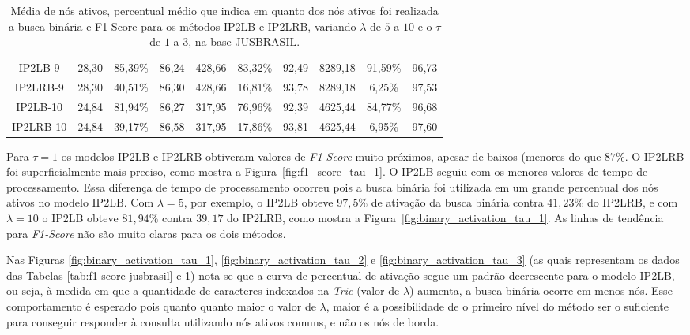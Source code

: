 \begin{table}[]
{\begin{tabular}{c|ccc|ccc|ccc|}
\multicolumn{1}{|c|}{IP2LB-9} & 28,30 & 85,39\% & 86,24 & 428,66 & 83,32\% & 92,49 & 8289,18 & 91,59\% & 96,73 \\
\multicolumn{1}{|c|}{IP2LRB-9} & 28,30 & 40,51\% & 86,30 & 428,66 & 16,81\% & 93,78 & 8289,18 & 6,25\% & 97,53 \\ \hline
\multicolumn{1}{|c|}{IP2LB-10} & 24,84 & 81,94\% & 86,27 & 317,95 & 76,96\% & 92,39 & 4625,44 & 84,77\% & 96,68 \\
\multicolumn{1}{|c|}{IP2LRB-10} & 24,84 & 39,17\% & 86,58 & 317,95 & 17,86\% & 93,81 & 4625,44 & 6,95\% & 97,60 \\ \hline
\end{tabular}%
}
\caption{Média de nós ativos, percentual médio que indica em quanto dos nós ativos foi realizada a busca binária e F1-Score para os métodos IP2LB e IP2LRB, variando $\lambda$ de $5$ a $10$ e o $\tau$ de $1$ a $3$, na base JUSBRASIL.}
\label{tab:binary-search-activation}
\end{table}

Para $\tau=1$ os modelos IP2LB e IP2LRB obtiveram valores de \textit{F1-Score} muito próximos, apesar de baixos (menores do que $87\%$. O IP2LRB foi superficialmente mais preciso, como mostra a Figura~\ref{fig:f1_score_tau_1}. O IP2LB seguiu com os menores valores de tempo de processamento. Essa diferença de tempo de processamento ocorreu pois a busca binária foi utilizada em um grande percentual dos nós ativos no modelo IP2LB. Com $\lambda=5$, por exemplo, o IP2LB obteve $97,5\%$ de ativação da busca binária contra $41,23\%$ do IP2LRB, e com $\lambda=10$ o IP2LB obteve $81,94\%$ contra $39,17$ do IP2LRB, como mostra a Figura~\ref{fig:binary_activation_tau_1}. As linhas de tendência para \textit{F1-Score} não são muito claras para os dois métodos. 

Nas Figuras \ref{fig:binary_activation_tau_1}, \ref{fig:binary_activation_tau_2} e \ref{fig:binary_activation_tau_3} (as quais representam os dados das Tabelas \ref{tab:f1-score-jusbrasil} e \ref{tab:binary-search-activation}) nota-se que a curva de percentual de ativação segue um padrão decrescente para o modelo IP2LB, ou seja, à medida em que a quantidade de caracteres indexados na \textit{Trie} (valor de $\lambda$) aumenta, a busca binária ocorre em menos nós. Esse comportamento é esperado pois quanto quanto maior o valor de $\lambda$, maior é a possibilidade de o primeiro nível do método ser o suficiente para conseguir responder à consulta utilizando nós ativos comuns, e não os nós de borda. 


